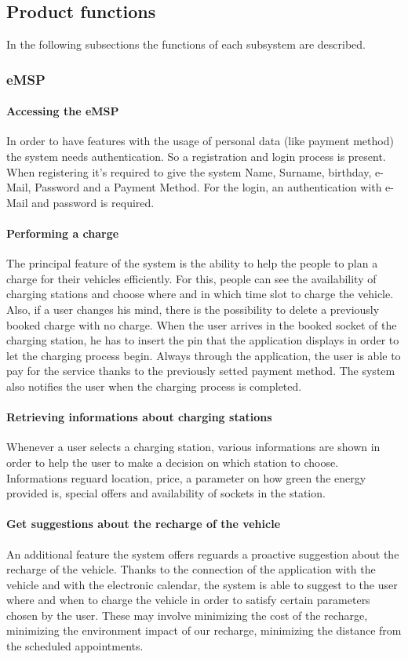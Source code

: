 \subsection{Product functions}
In the following subsections the functions of each subsystem are described.

\subsubsection{\ac{eMSP}}
\paragraph{Accessing the \ac{eMSP}}
In order to have features with the usage of personal data (like payment method) the system needs authentication. So a registration and login process is present. When registering it's required to give the system Name, Surname, birthday, e-Mail, Password and a Payment Method. For the login, an authentication with e-Mail and password is required.

\paragraph{Performing a charge}
The principal feature of the system is the ability to help the people to plan a charge for their vehicles efficiently. For this, people can see the availability of charging stations and choose where and in which time slot to charge the vehicle.
Also, if a user changes his mind, there is the possibility to delete a previously booked charge with no charge.
When the user arrives in the booked socket of the charging station, he has to insert the pin that the application displays in order to let the charging process begin.
Always through the application, the user is able to pay for the service thanks to the previously setted payment method.
The system also notifies the user when the charging process is completed.

\paragraph{Retrieving informations about charging stations}
Whenever a user selects a charging station, various informations are shown in order to help the user to make a decision on which station to choose. Informations reguard location, price, a parameter on how green the energy provided is, special offers and availability of sockets in the station.

\paragraph{Get suggestions about the recharge of the vehicle}
An additional feature the system offers reguards a proactive suggestion about the recharge of the vehicle. Thanks to the connection of the application with the vehicle and with the electronic calendar, the system is able to suggest to the user where and when to charge the vehicle in order to satisfy certain parameters chosen by the user. These may involve minimizing the cost of the recharge, minimizing the environment impact of our recharge, minimizing the distance from the scheduled appointments.


